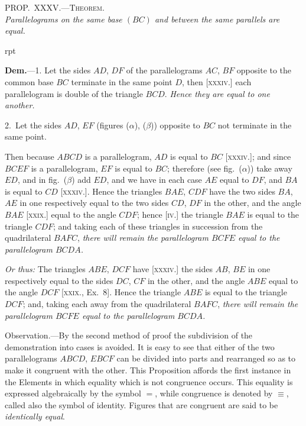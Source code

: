 \documentclass[oneside]{book}
\newcommand\myprop[2]{
\bigskip\Needspace*{4\baselineskip}\begin{center}\textsc{#1}\\\medskip\emph{#2}\par\end{center}
}
\newcommand\imgflow[3]{
\setcounter{wrapwidth}{#1}
\begin{wrapfigure}[#2]{r}{\value{wrapwidth}pt}
\begin{center}
\vspace{-0.3in}
\end{center}
\end{wrapfigure}
}
\newcommand\imgcent[2]{
\begin{center}
\end{center}
}
\begin{document}
\myprop{PROP\@.~XXXV\@.---Theorem.}{Parallelograms on the same base $(BC)$ and between the
same parallels are equal.}

\imgflow{175}{8}{f055}

\textbf{Dem.}---1. Let the sides $AD$, $DF$ of the parallelograms
$AC$, $BF$ opposite to the
common base $BC$ terminate
in the same
point $D$, then [\textsc{xxxiv}.]
each parallelogram is
double of the triangle
$BCD$. \emph{Hence they are
equal to one another.}

2.~Let the sides $AD$, $EF$ (figures ($\alpha$), ($\beta$)) opposite
to $BC$ not terminate in the same point.

\imgcent{338}{f056}

Then because $ABCD$ is a parallelogram, $AD$ is equal
to $BC$ [\textsc{xxxiv}.]; and since $BCEF$ is a parallelogram, $EF$
is equal to $BC$; therefore (see fig.~($\alpha$)) take away $ED$,
and in fig.~($\beta$) add $ED$, and we have in each case $AE$
equal to $DF$, and $BA$ is equal to $CD$ [\textsc{xxxiv}.]. Hence
the triangles $BAE$, $CDF$ have the two sides $BA$, $AE$ in
one respectively equal to the two sides $CD$, $DF$ in the
other, and the angle $BAE$ [\textsc{xxix}.] equal to the angle
$CDF$; hence [\textsc{iv}.] the triangle $BAE$ is equal to the triangle
$CDF$; and taking each of these triangles in succession
from the quadrilateral $BAFC$, \emph{there will remain
the parallelogram $BCFE$ equal to the parallelogram $BCDA$.}

\emph{Or thus:} The triangles $ABE$, $DCF$ have [\textsc{xxxiv}.]
the sides $AB$, $BE$ in one respectively equal to the sides
$DC$, $CF$ in the other, and the angle $ABE$ equal to the
angle $DCF$ [\textsc{xxix}., Ex.~8]. Hence the triangle $ABE$ is
equal to the triangle $DCF$; and, taking each away from
the quadrilateral $BAFC$, \emph{there will remain the parallelogram
$BCFE$ equal to the parallelogram $BCDA$.}\par\medskip

\begin{footnotesize}
\textsf{Observation}.---By the second method of proof the subdivision
of the demonstration into cases is avoided. It is easy to see that
either of the two parallelograms $ABCD$, $EBCF$ can be divided
into parts and rearranged so as to make it congruent with the
other. This Proposition affords the first instance in the Elements
in which equality which is not congruence occurs. This equality
is expressed algebraically by the symbol $=$, while congruence
is denoted by $\equiv$, called also the symbol of identity. Figures that
are congruent are said to be \emph{identically equal}.
\par\end{footnotesize}
\end{document}
